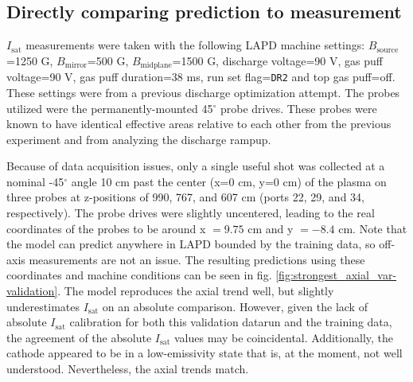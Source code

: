 \subsection{Directly comparing prediction to measurement}


$I_\text{sat}$ measurements were taken with the following LAPD machine settings: $B_\text{source}$=1250 G, $B_\text{mirror}$=500 G, $B_\text{midplane}$=1500 G, discharge voltage=90 V, gas puff voltage=90 V, gas puff duration=38 ms, run set flag=\texttt{DR2} and top gas puff=off. These settings were from a previous discharge optimization attempt. The probes utilized were the permanently-mounted 45$^\circ$ probe drives. These probes were known to have identical effective areas relative to each other from the previous experiment and from analyzing the discharge rampup.

Because of data acquisition issues, only a single useful shot was collected at a nominal -45$^\circ$ angle 10 cm past the center (x=0 cm, y=0 cm) of the plasma on three probes at z-positions of 990, 767, and 607 cm (ports 22, 29, and 34, respectively). The probe drives were slightly uncentered, leading to the real coordinates of the probes to be around x $=9.75$ cm and y $=-8.4$ cm. Note that the model can predict anywhere in LAPD bounded by the training data, so off-axis measurements are not an issue.
The resulting predictions using these coordinates and machine conditions can be seen in fig. \ref{fig:strongest_axial_var-validation}. 
The model reproduces the axial trend well, but slightly underestimates $I_\text{sat}$ on an absolute comparison. However, given the lack of absolute $I_\text{sat}$ calibration for both this validation datarun and the training data, the agreement of the absolute $I_\text{sat}$ values may be coincidental. Additionally, the cathode appeared to be in a low-emissivity state that is, at the moment, not well understood. Nevertheless, the axial trends match. 

